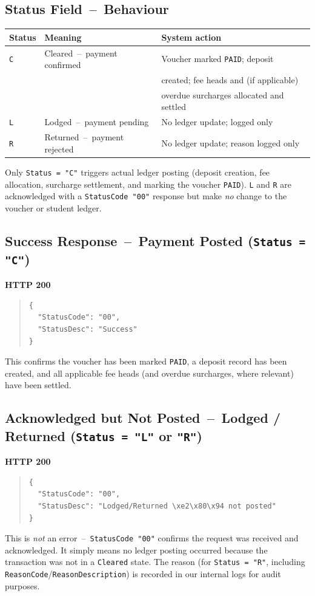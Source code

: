 \documentclass[11pt]{article}
\begin{document}
\subsection{Status Field \,--\, Behaviour}
\begin{center}
\begin{tabular}{@{}lll@{}}
\toprule
\textbf{Status} & \textbf{Meaning} & \textbf{System action} \\
\midrule
\texttt{C} & Cleared \,--\, payment confirmed & Voucher marked \texttt{PAID}; deposit \\
 & & created; fee heads and (if applicable) \\
 & & overdue surcharges allocated and settled \\
\texttt{L} & Lodged \,--\, payment pending & No ledger update; logged only \\
\texttt{R} & Returned \,--\, payment rejected & No ledger update; reason logged only \\
\bottomrule
\end{tabular}
\end{center}
\noindent Only \texttt{Status = "C"} triggers actual ledger posting (deposit creation, fee
allocation, surcharge settlement, and marking the voucher \texttt{PAID}). \texttt{L} and
\texttt{R} are acknowledged with a \texttt{StatusCode "00"} response but make \emph{no} change
to the voucher or student ledger.

\subsection{Success Response \,--\, Payment Posted (\texttt{Status = "C"})}
\textbf{HTTP 200}
\begin{quote}
\begin{verbatim}
{
  "StatusCode": "00",
  "StatusDesc": "Success"
}
\end{verbatim}
\end{quote}
This confirms the voucher has been marked \texttt{PAID}, a deposit record has been created,
and all applicable fee heads (and overdue surcharges, where relevant) have been settled.

\subsection{Acknowledged but Not Posted \,--\, Lodged / Returned (\texttt{Status = "L"} or \texttt{"R"})}
\textbf{HTTP 200}
\begin{quote}
\begin{verbatim}
{
  "StatusCode": "00",
  "StatusDesc": "Lodged/Returned \xe2\x80\x94 not posted"
}
\end{verbatim}
\end{quote}
\noindent This is \emph{not} an error \,--\, \texttt{StatusCode "00"} confirms the request was
received and acknowledged. It simply means no ledger posting occurred because the
transaction was not in a \texttt{Cleared} state. The reason (for \texttt{Status = "R"}, including
\texttt{ReasonCode}/\texttt{ReasonDescription}) is recorded in our internal logs for audit
purposes.
\end{document}
